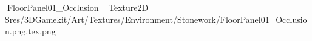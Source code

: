    FloorPanel01_Occlusion             	   Texture2D
   S   res/3DGamekit/Art/Textures/Environment/Stonework/FloorPanel01_Occlusion.png.tex.png